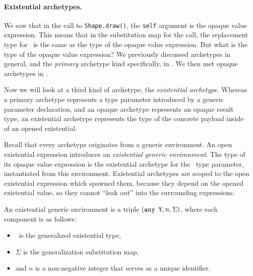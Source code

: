 \documentclass[../generics]{subfiles}
\begin{document}
\paragraph{Existential archetypes.}
We saw that in the call to \texttt{Shape.draw()}, the \texttt{self} argument is the opaque value expression. This means that in the substitution map for the call, the replacement type for \tSelf\ is the same as the type of the opaque value expression. But what is the type of the opaque value expression? We previously discussed archetypes in general, and the \emph{primary} archetype kind specifically, in . We then met opaque archetypes in .

Now we will look at a third kind of archetype, the \emph{existential archetype}. Whereas a primary archetype represents a type parameter introduced by a generic parameter declaration, and an opaque archetype represents an opaque result type, an existential archetype represents the type of the concrete payload inside of an opened existential.

Recall that every archetype originates from a generic environment. An open existential expression introduces an \emph{existential generic environment}. The type of its opaque value expression is the existential archetype for the \tSelf\ type parameter, instantiated from this environment. Existential archetypes are scoped to the open existential expression which spawned them, because they depend on the opened existential value, so they cannot ``leak out'' into the surrounding expressions.

\begin{definition}
An existential generic environment is a triple $(\texttt{any~Y},n,\Sigma)$, where each component is as follows:
\begin{itemize}
\item \AnyY\ is the generalized existential type,
\item  $\Sigma$ is the generalization substitution map,
\item and $n$ is a non-negative integer that serves as a unique identifier.
\end{itemize}
\end{definition}
\end{document}
